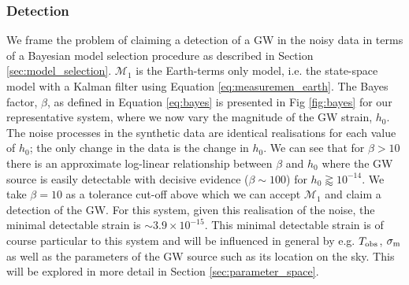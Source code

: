 \documentclass[fleqn,usenatbib,useAMS]{mnras}
\begin{document}
\subsubsection{Detection} \label{sec:detection}
We frame the problem of claiming a detection of a GW in the noisy data in terms of a Bayesian model selection procedure as described in Section \ref{sec:model_selection}. $\mathcal{M}_1$ is the Earth-terms only model, i.e. the state-space model with a Kalman filter using Equation \eqref{eq:measuremen_earth}. The Bayes factor, $\beta$, as defined in Equation \eqref{eq:bayes} is presented in Fig \ref{fig:bayes} for our representative system, where we now vary the magnitude of the GW strain, $h_0$. The noise processes in the synthetic data are identical realisations for each value of $h_0$; the only change in the data is the change in $h_0$. We can see that for $\beta >10$ there is an approximate log-linear relationship between $\beta$ and $h_0$ where the GW source is easily detectable with decisive evidence ($\beta \sim 100$) for $h_0 \gtrapprox 10^{-14}$. We take $\beta = 10$ as a tolerance cut-off above which we can accept $\mathcal{M}_1$ and claim a detection of the GW. For this system, given this realisation of the noise, the minimal detectable strain is $\sim 3.9 \times 10^{-15}$. This minimal detectable strain is of course particular to this system and will be influenced in general by e.g. $T_{\rm obs}$, $\sigma_{\rm m}$ as well as the parameters of the GW source such as its location on the sky. This will be explored in more detail in Section \ref{sec:parameter_space}. \newline 
\end{document}
